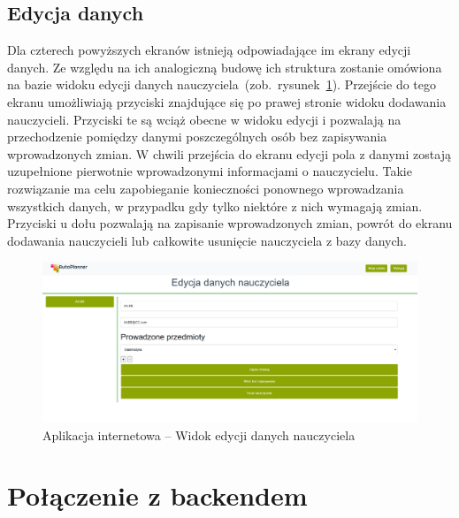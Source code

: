 \subsection{Edycja danych}
Dla czterech powyższych ekranów istnieją odpowiadające im ekrany edycji danych. Ze względu na ich analogiczną budowę ich struktura zostanie omówiona na bazie widoku edycji danych nauczyciela~(zob.~rysunek~\ref{rys:edit}). Przejście do tego ekranu umożliwiają przyciski znajdujące się po prawej stronie widoku dodawania nauczycieli. Przyciski te są wciąż obecne w widoku edycji i pozwalają na przechodzenie pomiędzy danymi poszczególnych osób bez zapisywania wprowadzonych zmian. W chwili przejścia do ekranu edycji pola z danymi zostają uzupełnione pierwotnie wprowadzonymi informacjami o nauczycielu. Takie rozwiązanie ma celu zapobieganie konieczności ponownego wprowadzania wszystkich danych, w przypadku gdy tylko niektóre z nich wymagają zmian. Przyciski u dołu pozwalają na zapisanie wprowadzonych zmian, powrót do ekranu dodawania nauczycieli lub całkowite usunięcie nauczyciela z bazy danych.
\begin{figure}[!ht]
\centering\includegraphics[width=\textwidth]{figures/edit}
\caption{Aplikacja internetowa -- Widok edycji danych nauczyciela}\label{rys:edit}
\end{figure}
\section{Połączenie z backendem}




